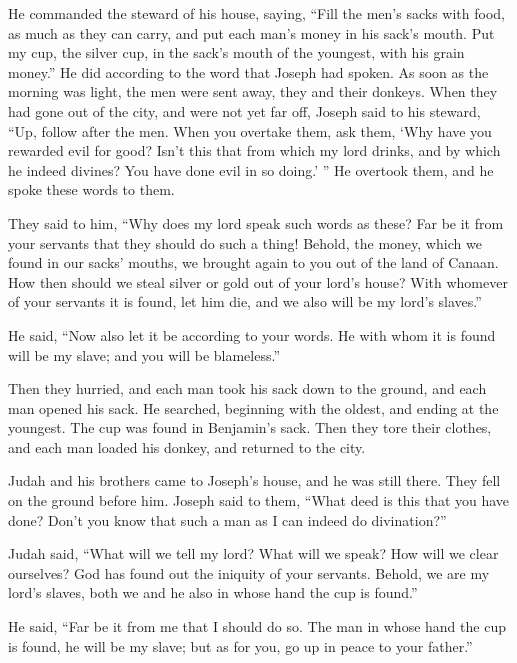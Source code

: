 \mychapter{}
\myverse*{}He commanded the steward of his house, saying, “Fill the men’s sacks with food, as much as they can carry, and put each man’s money in his sack’s mouth.  \myverse{}Put my cup, the silver cup, in the sack’s mouth of the youngest, with his grain money.” He did according to the word that Joseph had spoken.  \myverse{}As soon as the morning was light, the men were sent away, they and their donkeys.  \myverse{}When they had gone out of the city, and were not yet far off, Joseph said to his steward, “Up, follow after the men. When you overtake them, ask them, ‘Why have you rewarded evil for good?  \myverse{}Isn’t this that from which my lord drinks, and by which he indeed divines? You have done evil in so doing.’ ”  \myverse{}He overtook them, and he spoke these words to them.

\myverse{}They said to him, “Why does my lord speak such words as these? Far be it from your servants that they should do such a thing!  \myverse{}Behold, the money, which we found in our sacks’ mouths, we brought again to you out of the land of Canaan. How then should we steal silver or gold out of your lord’s house?  \myverse{}With whomever of your servants it is found, let him die, and we also will be my lord’s slaves.”

\myverse{}He said, “Now also let it be according to your words. He with whom it is found will be my slave; and you will be blameless.”

\myverse{}Then they hurried, and each man took his sack down to the ground, and each man opened his sack.  \myverse{}He searched, beginning with the oldest, and ending at the youngest. The cup was found in Benjamin’s sack.  \myverse{}Then they tore their clothes, and each man loaded his donkey, and returned to the city.

\myverse{}Judah and his brothers came to Joseph’s house, and he was still there. They fell on the ground before him.  \myverse{}Joseph said to them, “What deed is this that you have done? Don’t you know that such a man as I can indeed do divination?”

\myverse{}Judah said, “What will we tell my lord? What will we speak? How will we clear ourselves? God has found out the iniquity of your servants. Behold, we are my lord’s slaves, both we and he also in whose hand the cup is found.”

\myverse{}He said, “Far be it from me that I should do so. The man in whose hand the cup is found, he will be my slave; but as for you, go up in peace to your father.”

